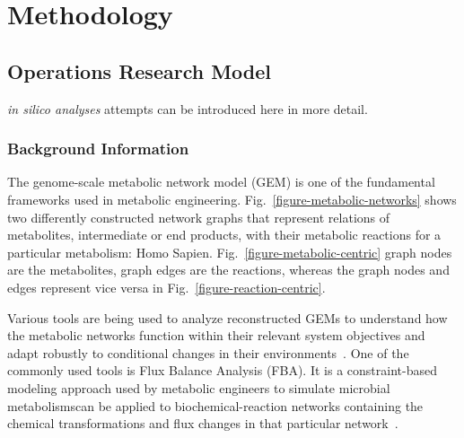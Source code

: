 \chapter{Methodology}
\section{Operations Research Model}
\emph{in silico analyses} attempts can be introduced here in more detail.

\subsection{Background Information}
The genome-scale metabolic network model (GEM) is one of the fundamental frameworks used in metabolic engineering. Fig.~\ref{figure-metabolic-networks} shows two differently constructed network graphs that represent relations of metabolites, intermediate or end products, with their metabolic reactions for a particular metabolism: Homo Sapien. Fig.~\ref{figure-metabolic-centric} graph nodes are the metabolites, graph edges are the reactions, whereas the graph nodes and edges represent vice versa in Fig.~\ref{figure-reaction-centric}. 



Various tools are being used to analyze reconstructed GEMs to understand how the metabolic networks function within their relevant system objectives and adapt robustly to conditional changes in their environments~\cite{KIM, HAO}. One of the commonly used tools is Flux Balance Analysis (FBA). It is a constraint-based modeling approach used by metabolic engineers to simulate microbial metabolisms\textemdash can be applied to biochemical-reaction networks containing the chemical transformations and flux changes in that particular network~\cite{KAUFFMAN2003491, PRICE2004}.

